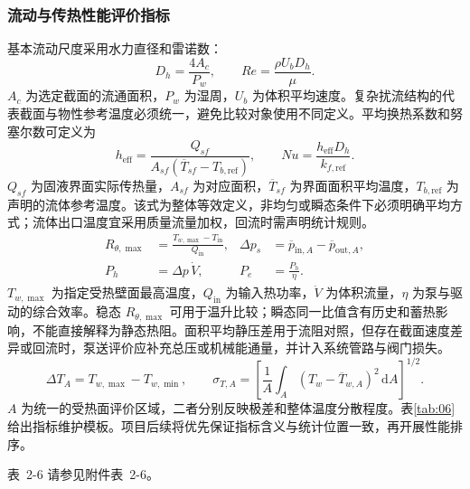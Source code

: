 \documentclass[UTF8]{midterm}
\makeatletter
\newcommand{\submissionnumber}[1]{\def\@currentlabel{#1}}
\makeatother
\begin{document}
\subsubsection{流动与传热性能评价指标}
基本流动尺度采用水力直径和雷诺数：
\begin{equation}
D_h=\frac{4A_c}{P_w},\qquad Re=\frac{\rho U_bD_h}{\mu}.\label{eq:re}
\end{equation}
$A_c$ 为选定截面的流通面积，$P_w$ 为湿周，$U_b$ 为体积平均速度。复杂扰流结构的代表截面与物性参考温度必须统一，避免比较对象使用不同定义。平均换热系数和努塞尔数可定义为
\begin{equation}
h_{\mathrm{eff}}=\frac{Q_{sf}}{A_{sf}(\overline T_{sf}-T_{b,\mathrm{ref}})},\qquad Nu=\frac{h_{\mathrm{eff}}D_h}{k_{f,\mathrm{ref}}}.\label{eq:nu}
\end{equation}
$Q_{sf}$ 为固液界面实际传热量，$A_{sf}$ 为对应面积，$\overline T_{sf}$ 为界面面积平均温度，$T_{b,\mathrm{ref}}$ 为声明的流体参考温度。该式为整体等效定义，非均匀或瞬态条件下必须明确平均方式；流体出口温度宜采用质量流量加权，回流时需声明统计规则。
\begin{equation}\begin{aligned}
R_{\theta,\max}&=\frac{T_{w,\max}-T_{\mathrm{in}}}{Q_{\mathrm{in}}},&
\Delta p_s&=\overline p_{\mathrm{in},A}-\overline p_{\mathrm{out},A},\\
P_h&=\Delta p\,\dot V,& P_e&=\frac{P_h}{\eta}.
\end{aligned}\label{eq:resistance}
\end{equation}
$T_{w,\max}$ 为指定受热壁面最高温度，$Q_{\mathrm{in}}$ 为输入热功率，$\dot V$ 为体积流量，$\eta$ 为泵与驱动的综合效率。稳态 $R_{\theta,\max}$ 可用于温升比较；瞬态同一比值含有历史和蓄热影响，不能直接解释为静态热阻。面积平均静压差用于流阻对照，但存在截面速度差异或回流时，泵送评价应补充总压或机械能通量，并计入系统管路与阀门损失。
\begin{equation}
\Delta T_A=T_{w,\max}-T_{w,\min},\qquad
\sigma_{T,A}=\left[\frac{1}{A}\int_A(T_w-\overline T_{w,A})^2\,\mathrm dA\right]^{1/2}.\label{eq:uniformity}
\end{equation}
$A$ 为统一的受热面评价区域，二者分别反映极差和整体温度分散程度。表\ref{tab:06}给出指标维护模板。项目后续将优先保证指标含义与统计位置一致，再开展性能排序。

\par\noindent \begingroup\submissionnumber{2-6}\label{tab:06}\endgroup 表~2-6 请参见附件表~2-6。\par
\end{document}
